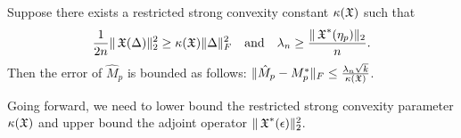 



\begin{lemma}
Suppose there exists a restricted strong convexity constant $\kappa(\operatorname{\mathfrak{X}})$ such that
$$\frac{1}{2n} \| \operatorname{\mathfrak{X}}( \Delta )\|_2^2 \ge \kappa(\operatorname{\mathfrak{X}}) \|\Delta\|^2_F \quad \text{and} \quad
\lambda_n \ge \frac{\|\operatorname{\mathfrak{X}}^*(\eta_p)\|_2}{n}.$$
Then the error of $\hat M_p$ is bounded as follows:
$\| \hat M_p - M_p^* \|_F \le \frac{\lambda_n \sqrt{k}}{\kappa(\operatorname{\mathfrak{X}})}$.
\end{lemma}

Going forward, we need to lower bound the restricted strong convexity
parameter $\kappa(\operatorname{\mathfrak{X}})$ and upper bound the adjoint operator
$\|\operatorname{\mathfrak{X}}^*(\epsilon)\|_{2}^2$.

